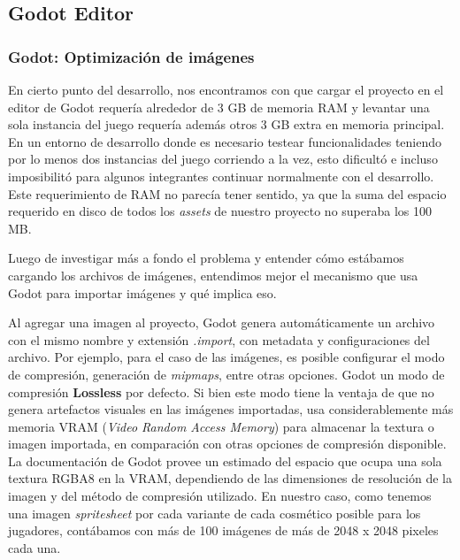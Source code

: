 \subsection{Godot Editor}

\subsubsection{Godot: Optimización de imágenes}

\noindent En cierto punto del desarrollo, nos encontramos con que cargar el proyecto en el editor de Godot
requería alrededor de 3 GB de memoria RAM y levantar una sola instancia del juego requería además
otros 3 GB extra en memoria principal. En un entorno de desarrollo donde es necesario testear
funcionalidades teniendo por lo menos dos instancias del juego corriendo a la vez, esto dificultó e incluso
imposibilitó para algunos integrantes continuar normalmente con el desarrollo. Este requerimiento
de RAM no parecía tener sentido, ya que la suma del espacio requerido en disco de todos los 
\textit{assets} de nuestro proyecto no superaba los 100 MB.

Luego de investigar más a fondo el problema y entender cómo estábamos cargando los archivos de imágenes,
entendimos mejor el mecanismo que usa Godot para importar imágenes y qué implica eso.

Al agregar una imagen al proyecto, Godot genera automáticamente un archivo con el mismo nombre y extensión
\textit{.import}, con metadata y configuraciones del archivo. 
Por ejemplo, para el caso de las imágenes, es posible configurar el modo de compresión, generación de 
\textit{mipmaps}, entre otras opciones. Godot un modo de compresión \textbf{Lossless} por defecto. 
Si bien este modo tiene la ventaja de que no genera artefactos visuales en las imágenes importadas, usa 
considerablemente más memoria VRAM (\textit{Video Random Access Memory}) para almacenar la textura o
imagen importada, en comparación con otras opciones de compresión disponible.
La documentación de Godot\cite{ref2} provee un estimado del espacio que ocupa una sola textura
RGBA8 en la VRAM, dependiendo de las dimensiones de resolución de la imagen y del método de compresión utilizado.
En nuestro caso, como tenemos una imagen \textit{spritesheet} por cada variante de cada cosmético posible para los jugadores,
contábamos con más de 100 imágenes de más de 2048 x 2048 pixeles cada una. 


